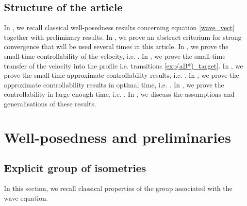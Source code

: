 \documentclass[a4paper]{article}
\theoremstyle{plain}
\begin{document}
\subsection{Structure of the article}

In , we recall classical well-posedness results concerning  equation \eqref{wave_vect} together with preliminary results. In , we prove an abstract criterium for strong convergence that will be used several times in this article. In , we prove the small-time controllability of the velocity, i.e. . 
In , we prove the small-time transfer of the velocity into the profile i.e. transitions \eqref{exp(aB*)_target}. In , we prove the small-time approximate controllability results, i.e. . In , we prove the approximate controllability results in optimal time, i.e. . In , we prove the controllability in large enough time, i.e. . In , we discuss the assumptions and generalisations of these results.

\section{Well-posedness and preliminaries}
\label{sec:WP}



\subsection{Explicit group of isometries}

In this section, we recall classical properties of the group associated with the wave equation.
\end{document}
